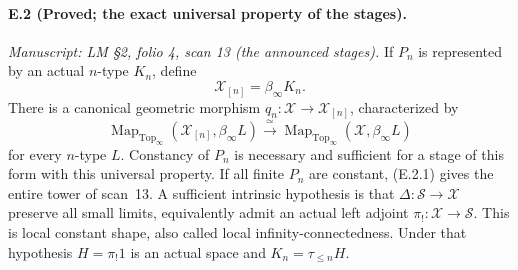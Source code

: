 
\paragraph{E.2 (Proved; the exact universal property of the stages).}
\textit{Manuscript: LM \S2, folio 4, scan 13 (the announced stages).}
If $P_n$ is represented by an actual $n$-type $K_n$, define
\[
 \mathcal X_{[n]}=\beta_\infty K_n.
                                                        \tag{E.2.1}
\]
There is a canonical geometric morphism $q_n:\mathcal X\to\mathcal X_{[n]}$, characterized by
\[
 \operatorname{Map}_{\mathrm{Top}_\infty}(\mathcal X_{[n]},\beta_\infty L)
  \xrightarrow{\ \simeq\ }
 \operatorname{Map}_{\mathrm{Top}_\infty}(\mathcal X,\beta_\infty L)
                                                        \tag{E.2.2}
\]
for every $n$-type $L$. Constancy of $P_n$ is necessary and sufficient for a stage of this form with this universal property. If all finite $P_n$ are constant, (E.2.1) gives the entire tower of scan~13. A sufficient intrinsic hypothesis is that $\Delta:\mathcal S\to\mathcal X$ preserve all small limits, equivalently admit an actual left adjoint $\pi_!:\mathcal X\to\mathcal S$. This is local constant shape, also called local infinity-connectedness. Under that hypothesis $H=\pi_!1$ is an actual space and $K_n=\tau_{\le n}H$.
